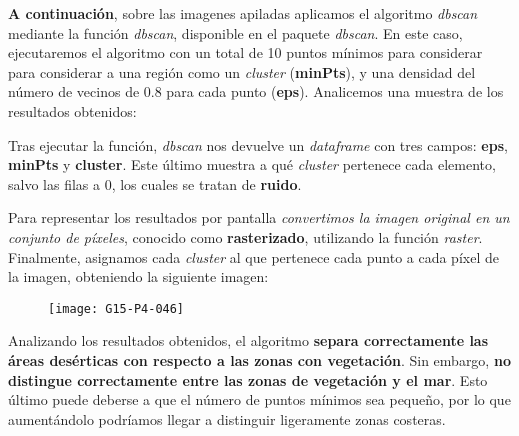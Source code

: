 \documentclass [a4paper] {article}
\begin{document}
\textbf{A continuación}, sobre las imagenes apiladas aplicamos el algoritmo \textit{dbscan} mediante la función \textit{dbscan}, disponible en el paquete \textit{dbscan}. En este caso, ejecutaremos el algoritmo con un total de 10 puntos mínimos para considerar para considerar a una región como un \textit{cluster} (\textbf{minPts}), y una densidad del número de vecinos de 0.8 para cada punto (\textbf{eps}). Analicemos una muestra de los resultados obtenidos:
Tras ejecutar la función, \textit{dbscan} nos devuelve un \textit{dataframe} con tres campos: \textbf{eps}, \textbf{minPts} y \textbf{cluster}. Este último muestra a qué \textit{cluster} pertenece cada elemento, salvo las filas a 0, los cuales se tratan de \textbf{ruido}.

Para representar los resultados por pantalla \textit{convertimos la imagen original en un conjunto de píxeles}, conocido como \textbf{rasterizado}, utilizando la función \textit{raster}. Finalmente, asignamos cada \textit{cluster} al que pertenece cada punto a cada píxel de la imagen, obteniendo la siguiente imagen:

\begin{figure}[h!]
\centering
\begin{Schunk}
\end{Schunk}
\texttt{[image: G15-P4-046]}
\end{figure}
\newpage
Analizando los resultados obtenidos, el algoritmo \textbf{separa correctamente las áreas desérticas con respecto a las zonas con vegetación}. Sin embargo, \textbf{no distingue correctamente entre las zonas de vegetación y el mar}. Esto último puede deberse
a que el número de puntos mínimos sea pequeño, por lo que aumentándolo podríamos llegar a distinguir ligeramente zonas costeras.
\end{document}
